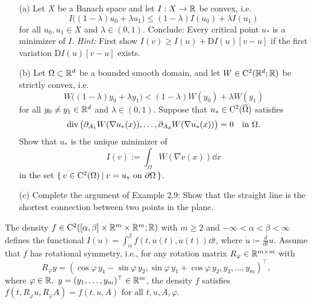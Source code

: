 \documentclass[12pt,a4paper]{article}
\begin{document}

\setcounter{AUFGABE}{6}

\begin{itemize}
\item[(a)]
Let $X$ be a Banach space and let
$I:X\to{\mathbb R}$ be convex, i.e.
\[
I\big((1{-}\lambda)u_0 + \lambda u_1\big)\leq (1{-}\lambda)I(u_0)+ \lambda I(u_1)
\]
for all $u_0,u_1\in X$ and $\lambda\in(0,1)$.
Conclude: Every critical  point $u_\ast$ is a minimizer of $I$.
\textit{Hint:} First show 
$I(v)\geq I(u)+ \mathrm{D}I(u)[v{-}u]$
if the first variation $\mathrm{D}I(u)[v{-}u]$ exists.
\item[(b)]
Let $\Omega\subset{\mathbb R}^d$ be a bounded smooth domain,
and let $W\in{\mathrm C}^2({\mathbb R}^d;{\mathbb R})$ be strictly convex, i.e.
\[
W\big((1{-}\lambda)y_0 + \lambda y_1\big)< (1{-}\lambda)W(y_0)+ \lambda W(y_1)
\]
for all $y_0\neq y_1\in {\mathbb R}^d$ and $\lambda\in(0,1)$.
Suppose that $u_\ast\in{\mathrm C}^2(\overline{\Omega})$
satisfies 
\[
\mathop{\mathrm{div}}\nolimits\big(\partial_{A_1} W(\nabla u_\ast(x)),\dots,\partial_{A_d}W(\nabla u_\ast(x))\big)=0
\quad\text{in }\Omega.
\]
Show that $u_\ast$ is the unique minimizer of 
\[
I(v):=\int_\Omega W(\nabla v(x))\dd x
\]
in the set $\{\, v\in {\mathrm C}^2(\Omega) \: | \: v=u_\ast \text{ on } \partial\Omega \,\}$.
\item[(c)]
Complete the argument of Example 2.9:
Show that the straight line is the shortest connection between two points in the plane.
\end{itemize}

The
density $f\in {\mathrm C}^2([\alpha,\beta]\times{\mathbb R}^m\times{\mathbb R}^m;{\mathbb R})$ with
$m\geq 2$ and $-\infty<\alpha<\beta<\infty$ defines
the functional  $I(u)=\int_{\alpha}^{\beta} f(t,u(t),\dot{u}(t))\dd t$,
where $\dot u \coloneqq \frac{d}{dt}u$.
Assume that $f$ has rotational symmetry, i.e.,
for any rotation matrix  $R_{\varphi}\in{\mathbb R}^{m\times{}m}$ with 
\[
R_{\varphi}y= ( \cos\varphi \,y_1 -\sin\varphi\, y_2,
\sin\varphi\, y_1 + \cos\varphi\, y_2,y_3,..., y_m)^\top,
\]
where $\varphi\in\R,\ y=(y_1,\ldots,y_m)^\top\in \R^m$,
the density $f$ satisfies  
$f(t,R_\varphi{}u,R_\varphi{}A)=f(t,u,A)$ for all $t,u,A,\varphi$.
\end{document}
